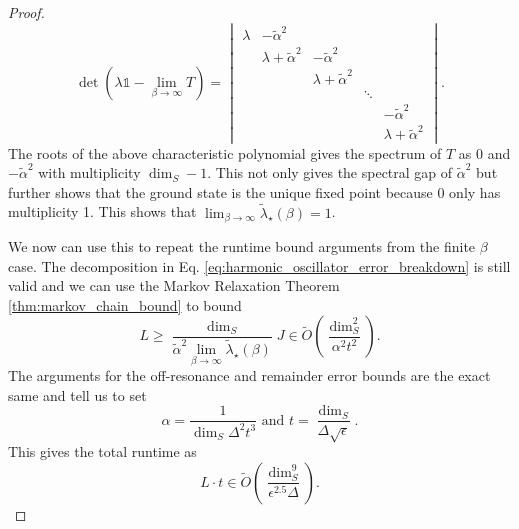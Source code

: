 \documentclass{article}
\newcommand{\bigotilde}[1]{\widetilde{O} \left( #1 \right)}
\newcommand{\identity}{\mathds{1}}
\begin{document}
\begin{proof}
\begin{equation}
    \det \left(\lambda \identity - \lim_{\beta \to \infty} T \right) =  \begin{vmatrix}
        \lambda & -\widetilde{\alpha}^2 &   &\\
        & \lambda + \widetilde{\alpha}^2 & -\widetilde{\alpha}^2 &  &\\
        & & \lambda + \widetilde{\alpha}^2  & & \\
        & & & \ddots & \\
        & &     &       & -\widetilde{\alpha}^2 \\
        & &  & & \lambda + \widetilde{\alpha}^2
    \end{vmatrix}.
\end{equation}
    The roots of the above characteristic polynomial gives the spectrum of $T$ as 0 and $-\widetilde{\alpha}^2$ with multiplicity $\dim_S - 1$. This not only gives the spectral gap of $\widetilde{\alpha}^2$ but further shows that the ground state is the unique fixed point because 0 only has multiplicity 1. This shows that $\lim_{\beta \to \infty} \widetilde{\lambda}_\star(\beta) = 1$.

    We now can use this to repeat the runtime bound arguments from the finite $\beta$ case. The decomposition in Eq. \eqref{eq:harmonic_oscillator_error_breakdown} is still valid and we can use the Markov Relaxation Theorem \ref{thm:markov_chain_bound} to bound
    \begin{equation}
        L \ge \frac{\dim_S}{\widetilde{\alpha}^2\lim_{\beta \to \infty} \widetilde{\lambda}_\star(\beta)} J \in \bigotilde{\frac{\dim_S^2}{\alpha^2 t^2}}.
    \end{equation}
    The arguments for the off-resonance and remainder error bounds are the exact same and tell us to set
    \begin{equation}
        \alpha = \frac{1}{\dim_S \Delta^2 t^3} \text{ and } t = \frac{\dim_S}{\Delta \sqrt{\epsilon}}.
    \end{equation}
    This gives the total runtime as
    \begin{equation}
        L\cdot t \in \bigotilde{\frac{\dim_S^9}{\epsilon^{2.5} \Delta}}.
    \end{equation}
\end{proof}
\end{document}
